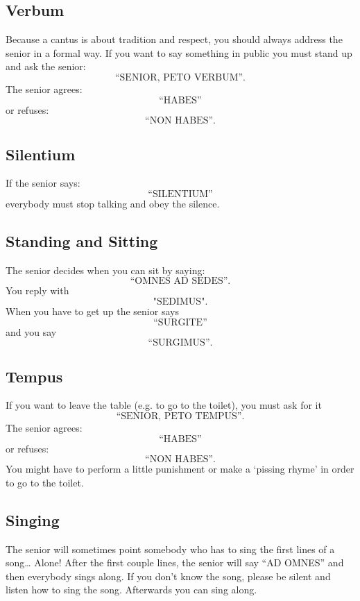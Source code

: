 \documentclass[a5paper]{article}
\begin{document}
\subsection{Verbum} 
\label{sub:verbum}

Because a cantus is about tradition and respect, you should always address the senior in a formal way. If you want to say something in public you must stand up and ask the senior: $$\text{``SENIOR, PETO VERBUM''}.$$ The senior agrees: $$\text{``HABES''}$$ or refuses: $$\text{``NON HABES''}.$$


\subsection{Silentium} %
\label{sub:silentium}


If the senior says: $$\text{``SILENTIUM''}$$ everybody must stop talking and obey the silence. 

\subsection{Standing and Sitting} %
\label{sub:standing_and_sitting}


The senior decides when you can sit by saying: $$\text{``OMNES AD SEDES''}.$$ You reply with $$\text{"SEDIMUS"}.$$ When you have to get up the senior says $$\text{``SURGITE''}$$ and you say $$\text{``SURGIMUS''}.$$ 

\subsection{Tempus} %
\label{sub:tempus}

If you want to leave the table (e.g. to go to the toilet), you must ask for it $$\text{``SENIOR, PETO TEMPUS''.}$$ The senior agrees: $$\text{``HABES''}$$ or refuses: $$\text{``NON HABES''.}$$ You might have to perform a little punishment or make a `pissing rhyme' in order to go to the toilet.


\subsection{Singing} %
\label{sub:singing}

The senior will sometimes point somebody who has to sing the first lines of a song… Alone! After the first couple lines, the senior will say ``AD OMNES'' and then everybody sings along. If you don't know the song, please be silent and listen how to sing the song. Afterwards you can sing along.\\
\end{document}
